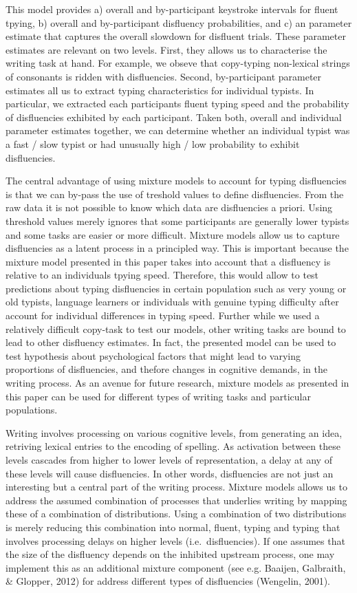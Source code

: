 \documentclass[english,jou,floatsintext]{apa7}
\begin{document}
This model provides a) overall and by-participant keystroke intervals for fluent tpying, b) overall and by-participant disfluency probabilities, and c) an parameter estimate that captures the overall slowdown for disfluent trials. These parameter estimates are relevant on two levels. First, they allows us to characterise the writing task at hand. For example, we obseve that copy-typing non-lexical strings of consonants is ridden with disfluencies. Second, by-participant parameter estimates all us to extract typing characteristics for individual typists. In particular, we extracted each participants fluent typing speed and the probability of disfluencies exhibited by each participant. Taken both, overall and individual parameter estimates together, we can determine whether an individual typist was a fast / slow typist or had unusually high / low probability to exhibit disfluencies.

The central advantage of using mixture models to account for typing disfluencies is that we can by-pass the use of treshold values to define disfluencies. From the raw data it is not possible to know which data are disfluencies a priori. Using threshold values merely ignores that some participants are generally lower typists and some tasks are easier or more difficult. Mixture models allow us to capture disfluencies as a latent process in a principled way. This is important because the mixture model presented in this paper takes into account that a disfluency is relative to an individuals tpying speed. Therefore, this would allow to test predictions about typing disfluencies in certain population such as very young or old typists, language learners or individuals with genuine typing difficulty after account for individual differences in typing speed. Further while we used a relatively difficult copy-task to test our models, other writing tasks are bound to lead to other disfluency estimates. In fact, the presented model can be used to test hypothesis about psychological factors that might lead to varying proportions of disfluencies, and thefore changes in cognitive demands, in the writing process. As an avenue for future research, mixture models as presented in this paper can be used for different types of writing tasks and particular populations.

Writing involves processing on various cognitive levels, from generating an idea, retriving lexical entries to the encoding of spelling. As activation between these levels cascades from higher to lower levels of representation, a delay at any of these levels will cause disfluencies. In other words, disfluencies are not just an interesting but a central part of the writing process. Mixture models allows us to address the assumed combination of processes that underlies writing by mapping these of a combination of distributions. Using a combination of two distributions is merely reducing this combination into normal, fluent, typing and typing that involves processing delays on higher levels (i.e.~disfluencies). If one assumes that the size of the disfluency depends on the inhibited upstream process, one may implement this as an additional mixture component (see e.g. Baaijen, Galbraith, \& Glopper, 2012) for address different types of disfluencies (Wengelin, 2001).
\end{document}
